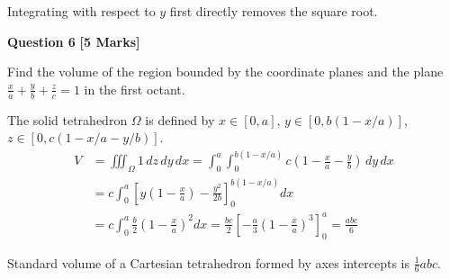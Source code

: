 \begin{examinertip}
Integrating with respect to $y$ first directly removes the square root.
\end{examinertip}

\vspace{4mm}

\noindent\textbf{Question 6} \hfill \textbf{[5 Marks]}

Find the volume of the region bounded by the coordinate planes and the plane $\frac{x}{a} + \frac{y}{b} + \frac{z}{c} = 1$ in the first octant.

\begin{solbox}
The solid tetrahedron $\Omega$ is defined by $x \in [0, a]$, $y \in [0, b(1 - x/a)]$, $z \in [0, c(1 - x/a - y/b)]$.
\begin{align}
V &= \iiint_\Omega 1\,dz\,dy\,dx = \int_0^a \int_0^{b(1-x/a)} c\left(1 - \frac{x}{a} - \frac{y}{b}\right)\,dy\,dx \\
&= c \int_0^a \left[ y\left(1 - \frac{x}{a}\right) - \frac{y^2}{2b} \right]_0^{b(1-x/a)} dx \\
&= c \int_0^a \frac{b}{2}\left(1 - \frac{x}{a}\right)^2 dx = \frac{b c}{2} \left[ -\frac{a}{3}\left(1 - \frac{x}{a}\right)^3 \right]_0^a = \frac{a b c}{6}
\end{align}
\end{solbox}

\begin{examinertip}
Standard volume of a Cartesian tetrahedron formed by axes intercepts is $\frac{1}{6}abc$.
\end{examinertip}

\vspace{4mm}

